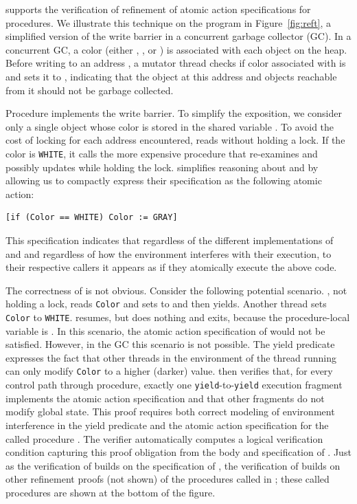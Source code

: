 \civl supports the verification of refinement of atomic action specifications for procedures. 
We illustrate this technique on the program in Figure~\ref{fig:reft},
a simplified version of the write barrier in a concurrent garbage collector (GC).
In a concurrent GC, a color (either , , or )
is associated with each object on the heap.  
Before writing to an address , a mutator thread checks 
if color associated with  is 
and sets it to , indicating that the object at this address
and objects reachable from it should not be garbage collected. 

Procedure  implements the write barrier.
To simplify the exposition, 
we consider only a single object whose color is stored in the shared variable .
To avoid the cost of locking for each address encountered,  reads  without holding a lock.
If the color is {\tt WHITE}, it calls the more expensive procedure  
that re-examines and possibly updates  while holding the lock.
\civl simplifies reasoning about  and  by allowing us to 
compactly express their specification as the following atomic action:
\begin{verbatim}
[if (Color == WHITE) Color := GRAY]
\end{verbatim}
This specification indicates that regardless of the different implementations of 
 and  and regardless of how the environment interferes
with their execution, to their respective callers it appears as if they atomically execute the above code.

The correctness of  is not obvious.
Consider the following potential scenario. 
, not holding a lock, reads {\tt Color} and
sets  to  and then yields. Another thread sets {\tt Color} to
{\tt WHITE}.  resumes, but does nothing and exits,
because the procedure-local variable  is . In this scenario, the atomic action
specification of  would not be satisfied. However, in the GC this
scenario is not possible. 
The yield predicate expresses the fact that
other threads in the environment of the thread running  can
only modify {\tt Color} to a higher (darker) value. 
\civl then verifies that, for every control path through 
procedure, exactly one {\tt yield}-to-{\tt yield} execution
fragment implements the atomic action specification and that other fragments do not modify
global state. 
This proof requires both correct modeling of environment interference in the yield predicate
and the atomic action specification for the called procedure .
The \civl verifier automatically computes a logical verification condition capturing
this proof obligation from the body and specification of .
Just as the verification of  builds on the specification of ,
the verification of  builds on other refinement proofs (not shown) 
of the procedures called in ;
these called procedures are shown at the bottom of the figure. 

